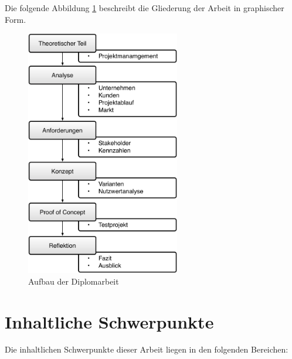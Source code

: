 Die folgende Abbildung \ref{pic:01_gliederung_arbeit} beschreibt die Gliederung der 
Arbeit in graphischer Form.

\begin{figure}[htbp]
\begin{center}
\includegraphics[width=0.6\textwidth,angle=0]{./bilder/einleitung/01_gliederung_arbeit.pdf}
\caption{Aufbau der Diplomarbeit}
\label{pic:01_gliederung_arbeit}
\end{center}
\end{figure}


\section{Inhaltliche Schwerpunkte}
Die inhaltlichen Schwerpunkte dieser Arbeit liegen in den folgenden Bereichen:

